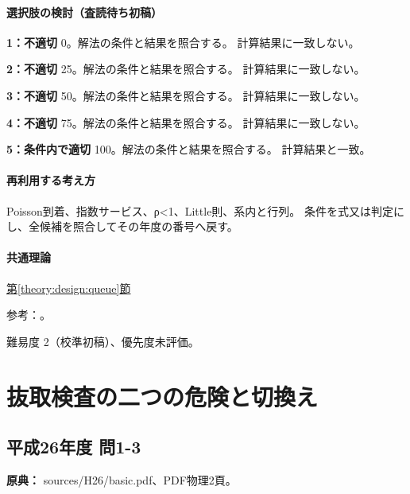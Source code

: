\paragraph{選択肢の検討（査読待ち初稿）}\mbox{}\par

\noindent\textbf{1：不適切} 0。解法の条件と結果を照合する。 計算結果に一致しない。\par

\noindent\textbf{2：不適切} 25。解法の条件と結果を照合する。 計算結果に一致しない。\par

\noindent\textbf{3：不適切} 50。解法の条件と結果を照合する。 計算結果に一致しない。\par

\noindent\textbf{4：不適切} 75。解法の条件と結果を照合する。 計算結果に一致しない。\par

\noindent\textbf{5：条件内で適切} 100。解法の条件と結果を照合する。 計算結果と一致。\par

\paragraph{再利用する考え方} Poisson到着、指数サービス、ρ<1、Little則、系内と行列。 条件を式又は判定にし、全候補を照合してその年度の番号へ戻す。

\paragraph{共通理論} \hyperref[theory:design:queue]{第\ref*{theory:design:queue}節}

\par 参考：\cite{design48_queue_ref}。

\par 難易度 2（校準初稿）、優先度未評価。

\section{抜取検査の二つの危険と切換え}

\subsection{平成26年度 問1-3}
\label{q:h26-reg-basic-1-3}

\noindent\textbf{原典：} sources/H26/basic.pdf、PDF物理2頁。

